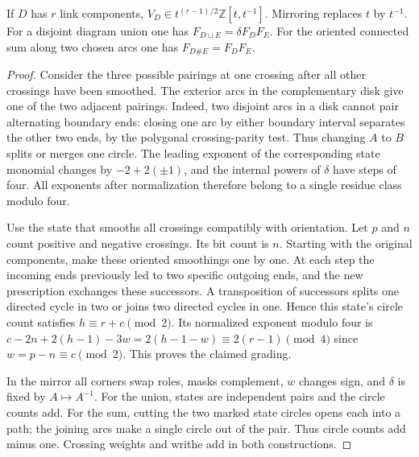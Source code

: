 \begin{proposition}
If $D$ has $r$ link components, $V_D\in
t^{(r-1)/2}\mathbb Z[t,t^{-1}]$. Mirroring replaces $t$ by $t^{-1}$.
For a disjoint diagram union one has $F_{D\sqcup E}=\delta F_D F_E$.
For the oriented connected sum along two chosen arcs one has
$F_{D\#E}=F_D F_E$.
\end{proposition}
\begin{proof}
Consider the three possible pairings at one crossing after all other
crossings have been smoothed. The exterior arcs in the complementary disk
give one of the two adjacent pairings. Indeed, two disjoint arcs in a
disk cannot pair alternating boundary ends: closing one arc by either
boundary interval separates the other two ends, by the polygonal
crossing-parity test. Thus changing $A$ to $B$ splits or merges one
circle. The leading exponent of the corresponding state monomial changes
by $-2+2(\pm1)$, and the internal powers of $\delta$ have steps of four.
All exponents after normalization therefore belong to a single residue
class modulo four.

Use the state that smooths all crossings compatibly with orientation.
Let $p$ and $n$ count positive and negative crossings. Its bit count is
$n$. Starting with the original components, make these oriented smoothings
one by one. At each step the incoming ends previously led to two specific
outgoing ends, and the new prescription exchanges these successors.
A transposition of successors splits one directed cycle in two or joins two
directed cycles in one. Hence this state's circle count satisfies
$h\equiv r+c\pmod2$. Its normalized exponent modulo four is
$c-2n+2(h-1)-3w=2(h-1-w)\equiv 2(r-1)\pmod4$ since
$w=p-n\equiv c\pmod2$. This proves the claimed grading.

In the mirror all corners swap roles, masks complement, $w$ changes sign,
and $\delta$ is fixed by $A\mapsto A^{-1}$. For the union, states are
independent pairs and the circle counts add. For the sum, cutting the two
marked state circles opens each into a path; the joining arcs make a
single circle out of the pair. Thus circle counts add minus one. Crossing
weights and writhe add in both constructions.
\end{proof}


